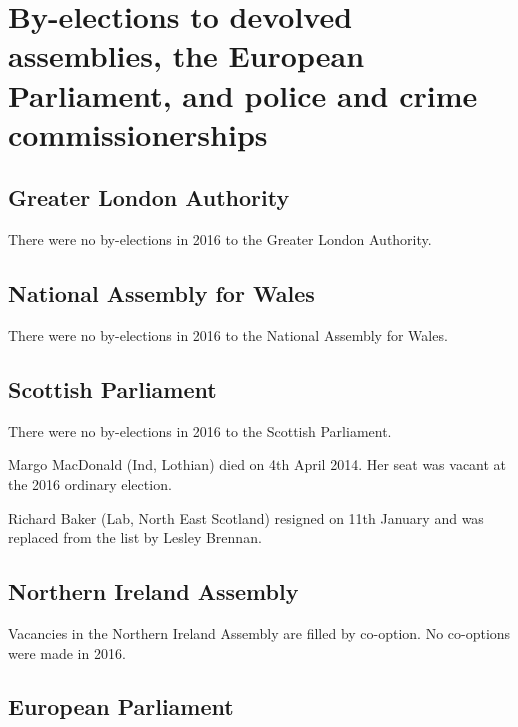 \documentclass[a4paper,openany]{book}
\begin{document}
\chapter{By-elections to devolved assemblies, the European Parliament, and police and crime commissionerships}

\section{Greater London Authority}

There were no by-elections in 2016 to the Greater London Authority.

\section{National Assembly for Wales}

There were no by-elections in 2016 to the National Assembly for Wales.

\section{Scottish Parliament}

There were no by-elections in 2016 to the Scottish Parliament.

Margo MacDonald (Ind, Lothian) died on 4th April 2014.  Her seat was vacant at the 2016 ordinary election.

Richard Baker (Lab, North East Scotland) resigned on 11th January and was replaced from the list by Lesley Brennan.

\section{Northern Ireland Assembly}

Vacancies in the Northern Ireland Assembly are filled by co-option.  No co-options were made in 2016.


\section{European Parliament}
\end{document}
